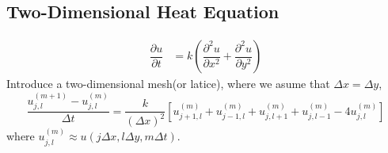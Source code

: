 \documentclass[12pt,a4paper]{article}
\begin{document}
\subsection{Two-Dimensional Heat Equation}
\begin{align*}
\dfrac{\partial u}{\partial t} &= k \left( \dfrac{\partial^2 u}{\partial x^2} +\dfrac{\partial^2 u}{\partial y^2}  \right)
\end{align*}
Introduce a two-dimensional mesh(or latice), where we asume that $\Delta x= \Delta y$,
\begin{equation}
\frac{u_{j,l}^{(m+1)} -u_{j,l}^{(m)} }{\Delta t} = \frac{k}{(\Delta x)^2} \left[u_{j+1,l}^{(m)} +u_{j-1,l}^{(m)} +u_{j,l+1}^{(m)} +u_{j,l-1}^{(m)} -4u_{j,l}^{(m)}\right]
\end{equation}
where $u_{j,l}^{(m)} \approx u(j\Delta x, l\Delta y, m\Delta t)$. 
\end{document}
